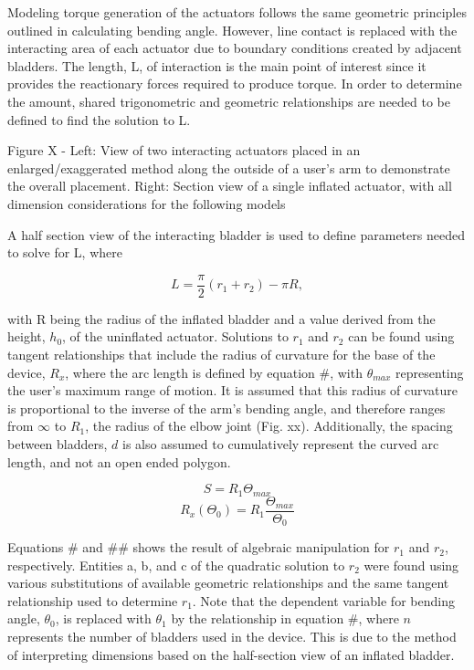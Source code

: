Modeling torque generation of the actuators follows the same geometric principles outlined in calculating bending angle. However, line contact is replaced with the interacting area of each actuator due to boundary conditions created by adjacent bladders. The length, L, of interaction is the main point of interest since it provides the reactionary forces required to produce torque. In order to determine the amount, shared trigonometric and geometric relationships are needed to be defined to find the solution to L.  












Figure X - Left: View of two interacting actuators placed in an enlarged/exaggerated method along the outside of a user’s arm to demonstrate the overall placement. Right: Section view of a single inflated actuator, with all dimension considerations for the following models

A half section view of the interacting bladder is used to define parameters needed to solve for L, where 

\begin{equation}\label{eq. X4}
	 L = \frac{\pi}{2}(r_1+r_2) - \pi R,
\end{equation}

with R being the radius of the inflated bladder and a value derived from the height, $h_0$, of the uninflated actuator. Solutions to $r_1$ and $r_2$ can be found using tangent relationships that include the radius of curvature for the base of the device, $R_x$, where the arc length is defined by equation #, with $\theta_{max}$ representing the user’s maximum range of motion. It is assumed that this radius of curvature is proportional to the inverse of the arm’s bending angle, and therefore ranges from ${\infty}$ to $R_{1}$, the radius of the elbow joint (Fig. xx). Additionally, the spacing between bladders, $d$ is also assumed to cumulatively represent the curved arc length, and not an open ended polygon. 

\begin{equation}\label{eq. X2}
	S = R_1\Theta_{max}
\end{equation}
\begin{equation}\label{eq. X3}
	R_x(\Theta_0) = R_1\frac{\Theta_{max}}{\Theta_0}
\end{equation}

Equations # and ## shows the result of algebraic manipulation for $r_1$ and $r_2$, respectively. Entities a, b, and c of the quadratic solution to $r_2$ were found using various substitutions of available geometric relationships and the same tangent relationship used to determine $r_1$. Note that the dependent variable for bending angle, $\theta_0$, is replaced with $\theta_1$ by the relationship in equation #, where $\textit{n}$ represents the number of bladders used in the device. This is due to the method of interpreting dimensions based on the half-section view of an inflated bladder. 

